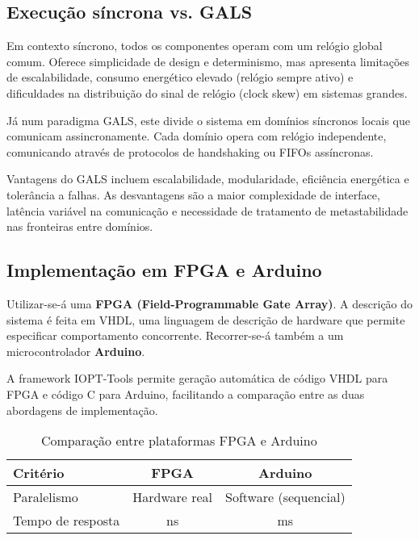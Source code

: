\subsection{Execução síncrona vs. GALS}

Em contexto síncrono, todos os componentes operam com um relógio global comum. Oferece simplicidade de design e determinismo, mas apresenta limitações de escalabilidade, consumo energético elevado (relógio sempre ativo) e dificuldades na distribuição do sinal de relógio (clock skew) em sistemas grandes.

Já num paradigma GALS, este divide o sistema em domínios síncronos locais que comunicam assincronamente. Cada domínio opera com relógio independente, comunicando através de protocolos de handshaking ou FIFOs assíncronas.

Vantagens do GALS incluem escalabilidade, modularidade, eficiência energética e tolerância a falhas. As desvantagens são a maior complexidade de interface, latência variável na comunicação e necessidade de tratamento de metastabilidade nas fronteiras entre domínios.

\subsection{Implementação em FPGA e Arduino}

Utilizar-se-á uma \textbf{FPGA (Field-Programmable Gate Array)}. A descrição do sistema é feita em VHDL, uma linguagem de descrição de hardware que permite especificar comportamento concorrente. Recorrer-se-á também a um microcontrolador \textbf{Arduino}.

A framework IOPT-Tools permite geração automática de código VHDL para FPGA e código C para Arduino, facilitando a comparação entre as duas abordagens de implementação.

\begin{table}[h]
\centering
\small
\begin{tabular}{|l|c|c|}
\hline
\textbf{Critério} & \textbf{FPGA} & \textbf{Arduino} \\
\hline
Paralelismo & Hardware real & Software (sequencial) \\
Tempo de resposta & ns & ms \\
\hline
\end{tabular}
\caption{Comparação entre plataformas FPGA e Arduino}
\end{table}